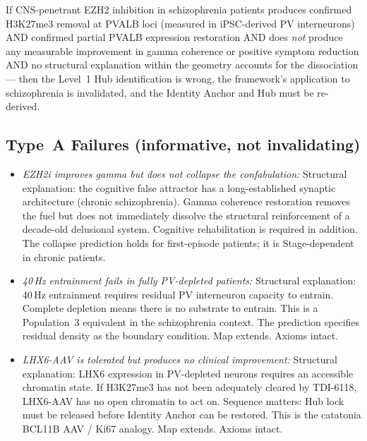 \documentclass[12pt,a4paper]{article}
\begin{document}
If CNS-penetrant EZH2 inhibition in schizophrenia patients
produces confirmed H3K27me3 removal at PVALB loci (measured
in iPSC-derived PV interneurons) AND confirmed partial PVALB
expression restoration AND does \emph{not} produce any
measurable improvement in gamma coherence or positive symptom
reduction AND no structural explanation within the geometry
accounts for the dissociation --- then the Level~1 Hub
identification is wrong, the framework's application to
schizophrenia is invalidated, and the Identity Anchor and Hub
must be re-derived.

\subsection{Type~A Failures (informative, not invalidating)}

\begin{itemize}
  \item \textit{EZH2i improves gamma but does not collapse
    the confabulation:}
    Structural explanation: the cognitive false attractor
    has a long-established synaptic architecture (chronic
    schizophrenia). Gamma coherence restoration removes
    the fuel but does not immediately dissolve the structural
    reinforcement of a decade-old delusional system.
    Cognitive rehabilitation is required in addition.
    The collapse prediction holds for first-episode patients;
    it is Stage-dependent in chronic patients.

  \item \textit{40\,Hz entrainment fails in fully PV-depleted
    patients:}
    Structural explanation: 40\,Hz entrainment requires
    residual PV interneuron capacity to entrain. Complete
    depletion means there is no substrate to entrain.
    This is a Population~3 equivalent in the schizophrenia
    context. The prediction specifies residual density as
    the boundary condition. Map extends. Axioms intact.

  \item \textit{LHX6-AAV is tolerated but produces no
    clinical improvement:}
    Structural explanation: LHX6 expression in
    PV-depleted neurons requires an accessible chromatin
    state. If H3K27me3 has not been adequately cleared
    by TDI-6118, LHX6-AAV has no open chromatin to act
    on. Sequence matters: Hub lock must be released before
    Identity Anchor can be restored. This is the catatonia
    BCL11B AAV / Ki67 analogy. Map extends. Axioms intact.
\end{itemize}
\end{document}
